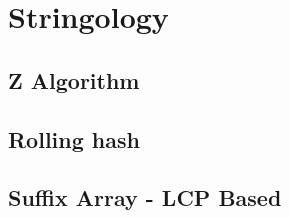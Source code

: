 \section{Stringology}

\subsection{Z Algorithm} 




%

\subsection{Rolling hash}



%

\subsection{Suffix Array - LCP Based}


